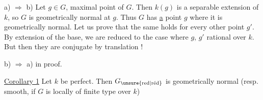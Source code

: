 a) $\Rightarrow$ b) \qquad Let $g\in G$,  maximal point of $G$.   Then $k(g)$ is a separable extension of $k$, so $G$ is geometrically normal at $g$.   Thus $G$ has \uline{a} point $g$ where it is geometrically normal. Let us prove that the same holds for every other point $g'$. By extension of the base, we are reduced to the case where $g$, $g'$ rational over $k$. But then they are conjugate by translation !

b) $\Rightarrow$ a) \qquad {} in proof.

\uline{Corollary 1} Let $k$ be perfect. Then $G_{\text{\unsure{red|réd}}}$ is geometrically normal  (resp. smooth, if $G$ is locally of finite type over $k$)

